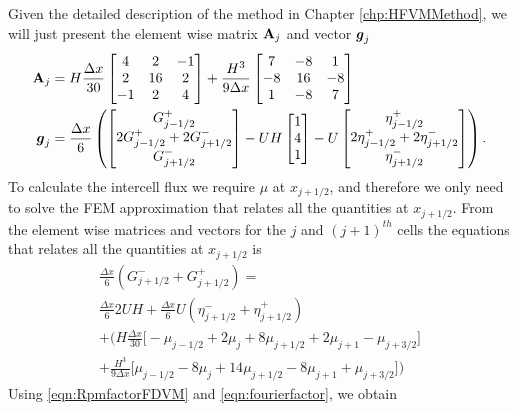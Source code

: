 Given the detailed description of the method in Chapter \ref{chp:HFVMMethod}, we will just present the element wise matrix $\mathbf{A}_j$ and vector $\boldsymbol{g}_j$ 
\begin{align}
\mathbf{A}_j &= H \frac{\Delta x}{30 } \begin{bmatrix} 4 &2 &-1 \\2 &16 &2  \\-1 &2 &4 \end{bmatrix} +  \frac{H^3 }{9\Delta x}\begin{bmatrix} 7 &-8 &1  \\-8 &16 &-8  \\1 &-8 &7  \end{bmatrix} \\
\boldsymbol{g}_j &=  \frac{\Delta x}{6} \left(\begin{bmatrix} G^+_{j -1/2} \\2 G^+_{j -1/2}+2 G^-_{j +1/2} \\ G^-_{j +1/2} \end{bmatrix} - UH\begin{bmatrix} 1 \\4 \\ 1 \end{bmatrix} - U\begin{bmatrix} \eta^+_{j -1/2} \\2 \eta^+_{j -1/2}+2 \eta^-_{j +1/2} \\ \eta^-_{j +1/2} \end{bmatrix} \right).
\end{align}
To calculate the intercell flux we require $\mu$ at $x_{j+1/2}$, and therefore we only need to solve the FEM approximation that relates all the quantities at $x_{j+1/2}$. From the element wise matrices and vectors for the $j$ and $\left(j+1\right)^{th}$ cells the equations that relates all the quantities at $x_{j+1/2}$ is
\begin{multline*}
\frac{\Delta x}{6} \left(G^-_{j +1/2} + G^+_{j +1/2} \right)= \\
\frac{\Delta x}{6} 2UH   + \frac{\Delta x}{6} U \left(\eta^-_{j +1/2} + \eta^+_{j +1/2} \right) \\ +   \Bigg(H\frac{\Delta x}{30} \Bigg[ -\mu_{j-1/2} +  2\mu_{j} + 8\mu_{j+1/2}  +  2 \mu_{j+1}  - \mu_{j+3/2}\Bigg]   \\ + \frac{H^3 }{9\Delta x} \Bigg[  \mu_{j-1/2} -8\mu_{j} + 14 \mu_{j+1/2} -8\mu_{j+1} + \mu_{j+3/2}  \Bigg]    \Bigg) 
\end{multline*}
Using \eqref{eqn:RpmfactorFDVM} and \eqref{eqn:fourierfactor}, we obtain

